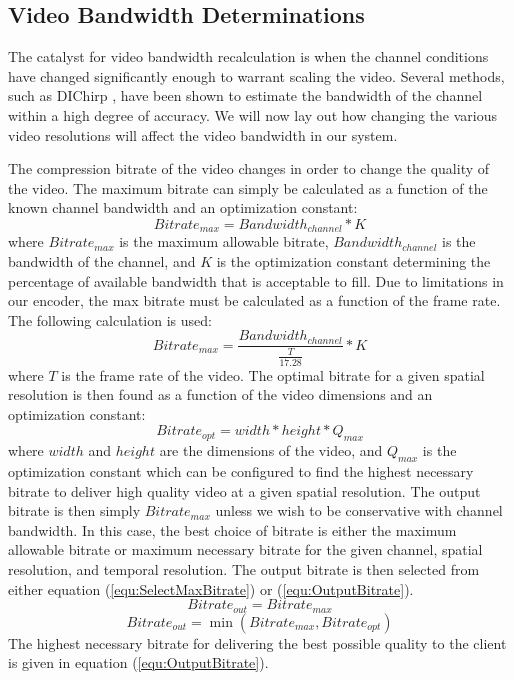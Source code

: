 \documentclass[3p,times,procedia]{elsarticle}
\begin{document}
\subsection{Video Bandwidth Determinations}
The catalyst for video bandwidth recalculation is when the channel conditions have changed significantly enough to warrant scaling the video. Several methods, such as DIChirp \cite{DIChirp}, have been shown to estimate the bandwidth of the channel within a high degree of accuracy. We will now lay out how changing the various video resolutions will affect the video bandwidth in our system.

The compression bitrate of the video changes in order to change the quality of the video. The maximum bitrate can simply be calculated as a function of the known channel bandwidth and an optimization constant:
\begin{equation}
\label{equ:BitrateCalculation}
Bitrate_{max} = Bandwidth_{channel} * K
\end{equation}
where $Bitrate_{max}$  is the maximum allowable bitrate, $Bandwidth_{channel}$ is the bandwidth of the channel, and $K$ is the optimization constant determining the percentage of available bandwidth that is acceptable to fill. Due to limitations in our encoder, the max bitrate must be calculated as a function of the frame rate. The following calculation is used: 
\begin{equation}
\label{equ:LimitedBitrateCalculation}
Bitrate_{max} = \frac {Bandwidth_{channel}}{\frac {T} {17.28} } * K
\end{equation}
where $T$ is the frame rate of the video. The optimal bitrate for a given spatial resolution is then found as a function of the video dimensions and an optimization constant:
\begin{equation}
\label{equ:OptimalBitrate}
Bitrate_{opt} = width * height * Q_{max}
\end{equation}
where $width$ and $height$ are the dimensions of the video, and $Q_{max}$ is the optimization constant which can be configured to find the highest necessary bitrate to deliver high quality video at a given spatial resolution. The output bitrate is then simply $Bitrate_{max}$ unless we wish to be conservative with channel bandwidth. In this case, the best choice of bitrate is either the maximum allowable bitrate or maximum necessary bitrate for the given channel, spatial resolution, and temporal resolution. The output bitrate is then selected from either equation (\ref{equ:SelectMaxBitrate}) or (\ref{equ:OutputBitrate}).
\begin{equation}
\label{equ:SelectMaxBitrate}
Bitrate_{out} = Bitrate_{max}
\end{equation}
\begin{equation}
\label{equ:OutputBitrate}
Bitrate_{out} = \min (Bitrate_{max} , Bitrate_{opt})
\end{equation}
The highest necessary bitrate for delivering the best possible quality to the client is given in equation (\ref{equ:OutputBitrate}).
\end{document}
